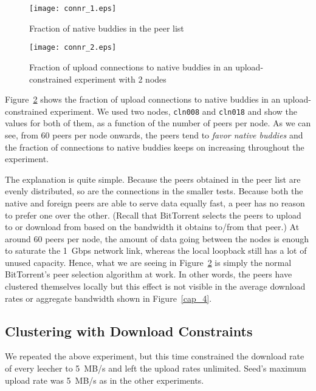 \documentclass[10pt,letterpaper,twocolumn]{article}
\begin{document}
\begin{figure}[!tb]
  \begin{center}
    \texttt{[image: connr\_1.eps]}
    \caption{Fraction of native buddies in the peer list}
    \label{connr_1}
  \end{center}
\end{figure}

\begin{figure}[!tb]
\begin{center}
\texttt{[image: connr\_2.eps]}
\caption{Fraction of upload connections to native buddies in an
  upload-constrained experiment with 2 nodes}
\label{connr_2}
\end{center}
\end{figure}

Figure~\ref{connr_2} shows the fraction of upload connections to
native buddies in an upload-constrained experiment. We used two nodes,
\texttt{cln008} and \texttt{cln018} and show the values for both of
them, as a function of the number of peers per node. As we can see,
from 60 peers per node onwards, the peers tend to \textit{favor native
buddies} and the fraction of connections to native buddies keeps on
increasing throughout the experiment.

The explanation is quite simple. Because the peers obtained in the
peer list are evenly distributed, so are the connections in the
smaller tests. Because both the native and foreign peers are able to
serve data equally fast, a peer has no reason to prefer one over the
other. (Recall that BitTorrent selects the peers to upload to or
download from based on the bandwidth it obtains to/from that peer.) At
around 60 peers per node, the amount of data going between the nodes
is enough to saturate the 1~Gbps network link, whereas the local
loopback still has a lot of unused capacity. Hence, what we are seeing
in Figure~\ref{connr_2} is simply the normal BitTorrent's peer
selection algorithm at work. In other words, the peers have clustered
themselves locally but this effect is not visible in the average
download rates or aggregate bandwidth shown in Figure~\ref{cap_4}. 





\subsection{Clustering with Download Constraints}
\label{cluster_nodes_dl}

We repeated the above experiment, but this time constrained the
download rate of every leecher to 5~MB/s and left the upload rates
unlimited. Seed's maximum upload rate was 5~MB/s as in the other
experiments. 
\end{document}

